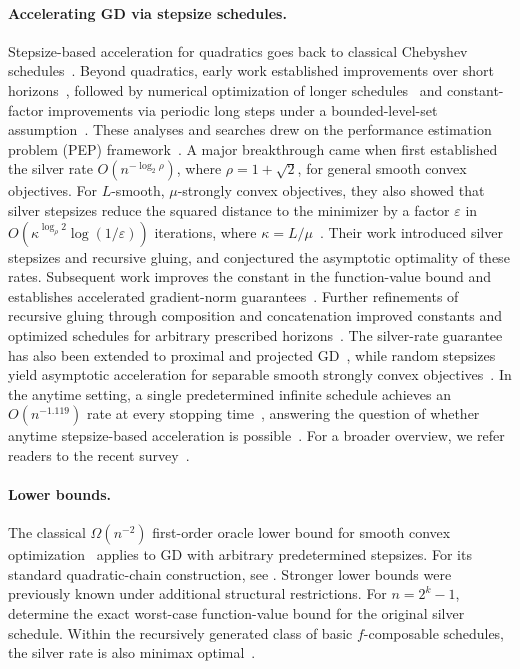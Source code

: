 \documentclass[11pt,letterpaper]{article}
\theoremstyle{definition}
\begin{document}
\paragraph{Accelerating GD via stepsize schedules.}
Stepsize-based acceleration for quadratics goes back to classical Chebyshev schedules~\citep{Young1953}.
Beyond quadratics, early work established improvements over short horizons~\citep[Chapter~8]{Altschuler2018}, followed by numerical optimization of longer schedules~\citep{DasGuptaVanParysRyu2024} and constant-factor improvements via periodic long steps under a bounded-level-set assumption~\citep{Grimmer2024}.
These analyses and searches drew on the performance estimation problem (PEP) framework~\citep{DroriTeboulle2014,TaylorHendrickxGlineur2017}.
A major breakthrough came when \citet{AltschulerParrilo2025} first established the silver rate $O(n^{-\log_2\rho})$, where $\rho=1+\sqrt{2}$, for general smooth convex objectives.
For $L$-smooth, $\mu$-strongly convex objectives, they also showed that silver stepsizes reduce the squared distance to the minimizer by a factor $\varepsilon$ in $O(\kappa^{\log_\rho 2}\log(1/\varepsilon))$ iterations, where $\kappa=L/\mu$~\citep{AltschulerParrilo2025HedgingI}.
Their work introduced silver stepsizes and recursive gluing, and conjectured the asymptotic optimality of these rates.
Subsequent work improves the constant in the function-value bound and establishes accelerated gradient-norm guarantees~\citep{GrimmerShuWang2025LongSteps}.
Further refinements of recursive gluing through composition and concatenation improved constants and optimized schedules for arbitrary prescribed horizons~\citep{GrimmerShuWang2025Composing,ZhangJiang2026}.
The silver-rate guarantee has also been extended to proximal and projected GD~\citep{BokAltschuler2026}, while random stepsizes yield asymptotic acceleration for separable smooth strongly convex objectives~\citep{AltschulerParrilo2024RandomStepsizes}.
In the anytime setting, a single predetermined infinite schedule achieves an $O(n^{-1.119})$ rate at every stopping time~\citep{ZhangLeeDuChen2025}, answering the question of whether anytime stepsize-based acceleration is possible~\citep{KornowskiShamir2024}.
For a broader overview, we refer readers to the recent survey~\citep{AltschulerParrilo2026Survey}.

\paragraph{Lower bounds.}
The classical $\Omega(n^{-2})$ first-order oracle lower bound for smooth convex optimization~\citep{NemirovskyYudin1983} applies to GD with arbitrary predetermined stepsizes.
For its standard quadratic-chain construction, see \citet[Section~2.1.2]{Nesterov2004}.
Stronger lower bounds were previously known under additional structural restrictions.
For $n=2^k-1$, \citet{WangMaYangZhou2024} determine the exact worst-case function-value bound for the original silver schedule.
Within the recursively generated class of basic $f$-composable schedules, the silver rate is also minimax optimal~\citep{GrimmerShuWang2025Composing}.
\end{document}
